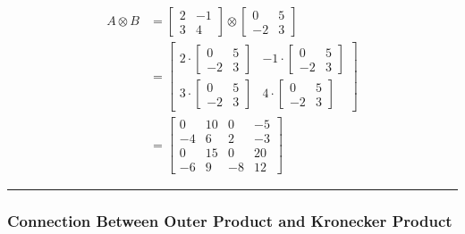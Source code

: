\documentclass[
  letterpaper,
  DIV=11,
  numbers=noendperiod]{scrreprt}
\theoremstyle{plain}
\theoremstyle{definition}
\theoremstyle{remark}
\begin{document}
\begin{align*}
A \otimes B &= \begin{bmatrix}2&-1\\3&4\end{bmatrix} \otimes \begin{bmatrix}0&5\\-2&3\end{bmatrix} \\
&= \begin{bmatrix}
2 \cdot \begin{bmatrix}0&5\\-2&3\end{bmatrix} & -1 \cdot \begin{bmatrix}0&5\\-2&3\end{bmatrix} \\
3 \cdot \begin{bmatrix}0&5\\-2&3\end{bmatrix} & 4 \cdot \begin{bmatrix}0&5\\-2&3\end{bmatrix}
\end{bmatrix} \\
&= \begin{bmatrix}
0 & 10 & 0 & -5 \\
-4 & 6 & 2 & -3 \\
0 & 15 & 0 & 20 \\
-6 & 9 & -8 & 12
\end{bmatrix}
\end{align*}

\begin{center}\rule{0.5\linewidth}{0.5pt}\end{center}

\subsubsection{Connection Between Outer Product and Kronecker
Product}\label{connection-between-outer-product-and-kronecker-product}
\end{document}
